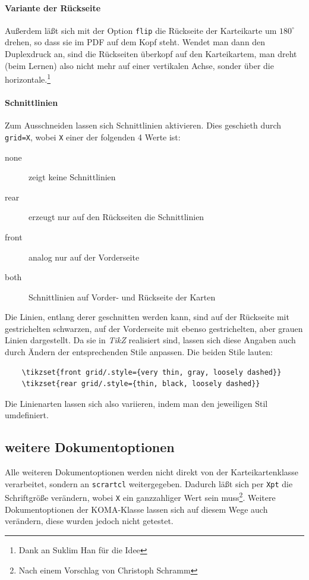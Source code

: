 \documentclass[a4paper,DIV=calc]{scrartcl}
\newcommand{\befehl}[1]{%
\marginpar{\textsf{#1}}%
}
\begin{document}
\paragraph{Variante der Rückseite} 
Außerdem läßt sich mit der Option \befehl{flip}\lstinline!flip! die Rückseite der Karteikarte um $180^{\circ}$ drehen, so dass sie im PDF auf dem Kopf steht. Wendet man dann den Duplexdruck an, sind die Rückseiten überkopf auf den Karteikartem, man dreht (beim Lernen) also nicht mehr auf einer vertikalen Achse, sonder über die horizontale.\footnote{Dank an Suklim Han für die Idee}

\paragraph{Schnittlinien}
Zum Ausschneiden lassen sich Schnittlinien aktivieren. Dies geschieth durch \befehl{grid=X} \lstinline!grid=X!, wobei \lstinline!X! einer der folgenden 4 Werte ist:
\begin{description}
	\item[none] zeigt keine Schnittlinien
	\item[rear] erzeugt nur auf den Rückseiten die Schnittlinien
	\item[front] analog nur auf der Vorderseite
	\item[both] Schnittlinien auf Vorder- und Rückseite der Karten	
\end{description}
Die Linien, entlang derer geschnitten werden kann, sind auf der Rückseite mit gestrichelten schwarzen, auf der Vorderseite mit ebenso gestrichelten, aber grauen Linien dargestellt. Da sie in \emph{TikZ} realisiert sind, lassen sich diese Angaben auch durch Ändern der entsprechenden Stile anpassen. Die beiden Stile lauten:
\begin{lstlisting}
	\tikzset{front grid/.style={very thin, gray, loosely dashed}}
	\tikzset{rear grid/.style={thin, black, loosely dashed}}
\end{lstlisting}
Die Linienarten lassen sich also variieren, indem man den jeweiligen Stil umdefiniert.
\subsection{weitere Dokumentoptionen}
Alle weiteren Dokumentoptionen werden nicht direkt von der Karteikartenklasse verarbeitet, sondern an \lstinline!scrartcl! weitergegeben. Dadurch läßt sich per \befehl{Xpt}\lstinline!Xpt! die Schriftgröße verändern, wobei \lstinline!X! ein ganzzahliger Wert sein muss\footnote{Nach einem Vorschlag von Christoph Schramm}. Weitere Dokumentoptionen der KOMA-Klasse lassen sich auf diesem Wege auch verändern, diese wurden jedoch nicht getestet.
\end{document}

